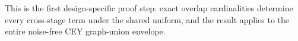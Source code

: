 This is the first design-specific proof step: exact overlap cardinalities determine every cross-stage term under the shared uniform, and the result applies to the entire noise-free CEY graph-union envelope.